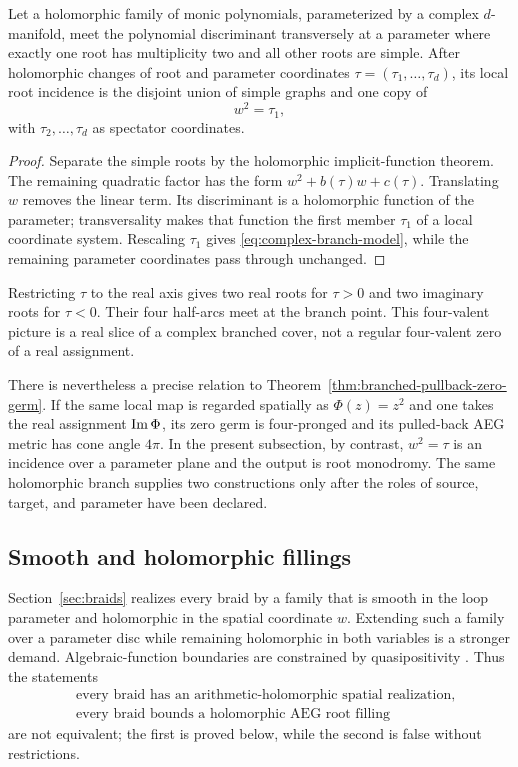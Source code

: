 \begin{proposition}
\label{prop:simple-discriminant-normal-form}
Let a holomorphic family of monic polynomials, parameterized by a complex
$d$-manifold, meet the polynomial discriminant transversely at a parameter where
exactly one root has multiplicity two and all other roots are simple.  After
holomorphic changes of root and parameter coordinates
$\tau=(\tau_1,\ldots,\tau_d)$, its local root incidence is the disjoint union of
simple graphs and one copy of
\[
 w^2=\tau_1,
\]
with $\tau_2,\ldots,\tau_d$ as spectator coordinates.
\end{proposition}

\begin{proof}
Separate the simple roots by the holomorphic implicit-function theorem.  The
remaining quadratic factor has the form $w^2+b(\tau)w+c(\tau)$.  Translating
$w$ removes the linear term.  Its discriminant is a holomorphic function of the
parameter; transversality makes that function the first member $\tau_1$ of a
local coordinate system.  Rescaling $\tau_1$ gives
\eqref{eq:complex-branch-model}, while the remaining parameter coordinates pass
through unchanged.
\end{proof}

Restricting $\tau$ to the real axis gives two real roots for $\tau>0$ and two
imaginary roots for $\tau<0$.  Their four half-arcs meet at the branch point.  This
four-valent picture is a real slice of a complex branched cover, not a regular
four-valent zero of a real assignment.

There is nevertheless a precise relation to
Theorem~\ref{thm:branched-pullback-zero-germ}.  If the same local map is regarded
spatially as $\Phi(z)=z^2$ and one takes the real assignment
$\operatorname{Im}\Phi$, its zero germ is four-pronged and its pulled-back AEG metric has cone
angle $4\pi$.  In the present subsection, by contrast, $w^2=\tau$ is an incidence
over a parameter plane and the output is root monodromy.  The same holomorphic
branch supplies two constructions only after the roles of source, target, and
parameter have been declared.

\subsection{Smooth and holomorphic fillings}

Section~\ref{sec:braids} realizes every braid by a family that is smooth in the
loop parameter and holomorphic in the spatial coordinate $w$.  Extending such a
family over a parameter disc while remaining holomorphic in both variables is a
stronger demand.  Algebraic-function boundaries are constrained by
quasipositivity \cite{Rudolph1983AlgebraicFunctions}.  Thus the statements
\begin{align*}
 &\text{every braid has an arithmetic-holomorphic spatial realization},\\
 &\text{every braid bounds a holomorphic AEG root filling}
\end{align*}
are not equivalent; the first is proved below, while the second is false without
restrictions.

